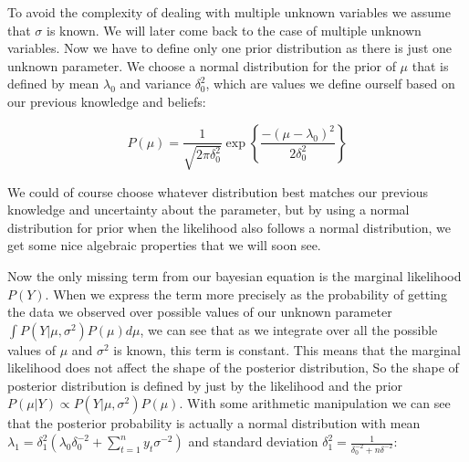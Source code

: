 \documentclass[12pt,a4paper,leqno]{report}
\theoremstyle{plain}
\theoremstyle{definition}
\theoremstyle{remark}
\begin{document}
To avoid the complexity of dealing with multiple unknown variables we assume
that \(\sigma \) is known. We will later come back to the case of multiple
unknown variables. Now we have to define only one prior distribution as there is
just one unknown parameter. We choose a normal distribution for the prior of
\(\mu \) that is defined by mean \(\lambda_0 \) and variance \(\delta_0^2 \),
which are values we define ourself based on our previous knowledge and beliefs:

\begin{def}\label{}
    \begin{equation}\label{}
        P(\mu)
        =
        \frac{1}
        {{\sqrt {2\pi \delta_0^2} }}
        \exp{ \left \{\frac{-(\mu-\lambda_0)^2} {2\delta_0^2} \right \} }
    \end{equation}
\end{def}

We could of course choose whatever distribution best matches our previous
knowledge and uncertainty about the parameter, but by using a normal distribution
for prior when the likelihood also follows a normal distribution, we get some
nice algebraic properties that we will soon see.

Now the only missing term from our bayesian equation is the marginal likelihood
\(P(Y) \). When we express the term more precisely as the probability of getting
the data we observed over possible values of our unknown parameter \(\int
P(Y|\mu,\sigma^2)P(\mu) d\mu \), we can see that as we integrate over all the possible
values of \(\mu \) and \(\sigma^2\) is known, this term is constant. This means that the marginal likelihood does
not affect the shape of the posterior distribution, So the shape of posterior
distribution is defined by just by the likelihood and the prior \(P(\mu|Y)
\propto P(Y|\mu, \sigma^2)P(\mu) \). With some arithmetic manipulation we can
see that the posterior probability is actually a normal distribution with mean
\(\lambda_1 = \delta_1^2 \left( \lambda_0 \delta_0^{-2} + \sum_{t=1}^{n} y_t \sigma^{-2}
\right) \) and standard deviation \(\delta_1^2 =
\frac{1}{\delta_0^{-2}+n\delta^{-2}} \):
\end{document}
